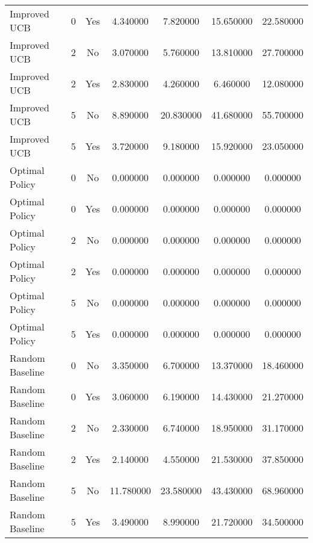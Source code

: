 \begin{tabular}{|l|c|c|c|c|c|c|}
Improved UCB & 0 & Yes & 4.340000 & 7.820000 & 15.650000 & 22.580000 \\
Improved UCB & 2 & No & 3.070000 & 5.760000 & 13.810000 & 27.700000 \\
Improved UCB & 2 & Yes & 2.830000 & 4.260000 & 6.460000 & 12.080000 \\
Improved UCB & 5 & No & 8.890000 & 20.830000 & 41.680000 & 55.700000 \\
Improved UCB & 5 & Yes & 3.720000 & 9.180000 & 15.920000 & 23.050000 \\
Optimal Policy & 0 & No & 0.000000 & 0.000000 & 0.000000 & 0.000000 \\
Optimal Policy & 0 & Yes & 0.000000 & 0.000000 & 0.000000 & 0.000000 \\
Optimal Policy & 2 & No & 0.000000 & 0.000000 & 0.000000 & 0.000000 \\
Optimal Policy & 2 & Yes & 0.000000 & 0.000000 & 0.000000 & 0.000000 \\
Optimal Policy & 5 & No & 0.000000 & 0.000000 & 0.000000 & 0.000000 \\
Optimal Policy & 5 & Yes & 0.000000 & 0.000000 & 0.000000 & 0.000000 \\
Random Baseline & 0 & No & 3.350000 & 6.700000 & 13.370000 & 18.460000 \\
Random Baseline & 0 & Yes & 3.060000 & 6.190000 & 14.430000 & 21.270000 \\
Random Baseline & 2 & No & 2.330000 & 6.740000 & 18.950000 & 31.170000 \\
Random Baseline & 2 & Yes & 2.140000 & 4.550000 & 21.530000 & 37.850000 \\
Random Baseline & 5 & No & 11.780000 & 23.580000 & 43.430000 & 68.960000 \\
Random Baseline & 5 & Yes & 3.490000 & 8.990000 & 21.720000 & 34.500000 \\
\bottomrule
\end{tabular}
